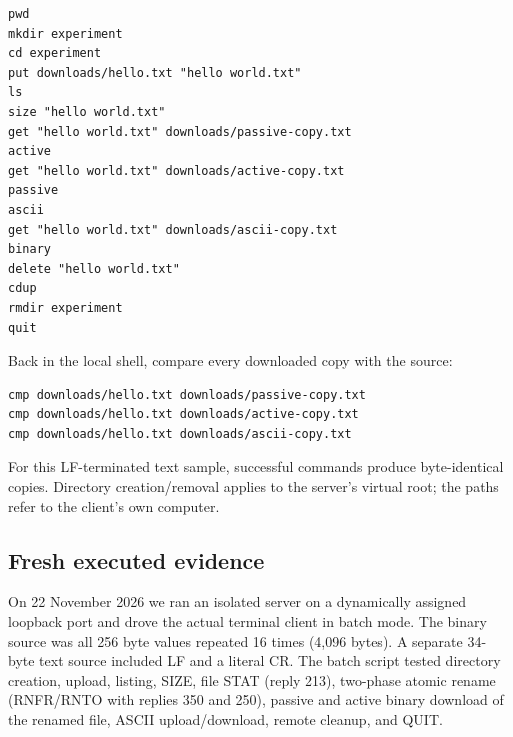\begin{lstlisting}[style=ftpterm,caption={Commands entered at the client's ftp prompt.}]
pwd
mkdir experiment
cd experiment
put downloads/hello.txt "hello world.txt"
ls
size "hello world.txt"
get "hello world.txt" downloads/passive-copy.txt
active
get "hello world.txt" downloads/active-copy.txt
passive
ascii
get "hello world.txt" downloads/ascii-copy.txt
binary
delete "hello world.txt"
cdup
rmdir experiment
quit
\end{lstlisting}

Back in the local shell, compare every downloaded copy with the source:
\begin{lstlisting}[style=ftpterm]
cmp downloads/hello.txt downloads/passive-copy.txt
cmp downloads/hello.txt downloads/active-copy.txt
cmp downloads/hello.txt downloads/ascii-copy.txt
\end{lstlisting}
For this LF-terminated text sample, successful commands produce byte-identical copies. Directory creation/removal applies to the server's virtual root; the  paths refer to the client's own computer.

\subsection{Fresh executed evidence}
On 22 November 2026 we ran an isolated server on a dynamically assigned loopback port and drove the actual terminal client in batch mode. The binary source was all 256 byte values repeated 16 times (4,096 bytes). A separate 34-byte text source included LF and a literal CR. The batch script tested directory creation, upload, listing, SIZE, file STAT (reply 213), two-phase atomic rename (RNFR/RNTO with replies 350 and 250), passive and active binary download of the renamed file, ASCII upload/download, remote cleanup, and QUIT.



